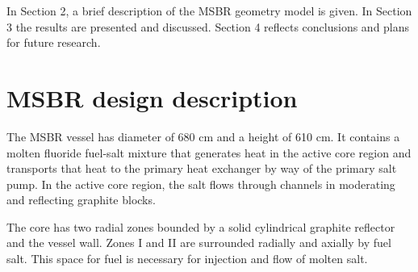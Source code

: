 \documentclass{anstrans}
\begin{document}
In Section 2, a brief description of the \gls{MSBR} geometry model is given. In 
Section 3 the results are presented and discussed. Section 4 reflects 
conclusions and plans for future research.  

\section{MSBR design description}
The \gls{MSBR} vessel has diameter of 680 cm and a height of 610 cm. It 
contains a molten fluoride fuel-salt mixture that generates heat in the active 
core region and transports that heat to the primary heat exchanger by way of 
the primary salt pump.
In the active core region, the salt flows through channels in moderating 
and reflecting graphite blocks.

The core has two radial zones bounded by a solid cylindrical graphite reflector 
and the vessel wall.  Zones I and II are surrounded radially and axially by 
fuel salt. This space for fuel is necessary for injection and flow of molten salt.
\end{document}
